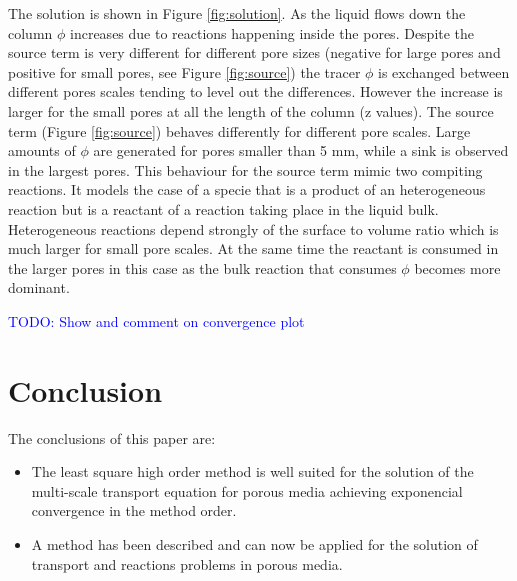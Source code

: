 \documentclass{CFD2011}
\newcommand{\TODO}[1]{\textcolor{blue}{TODO: #1} \\}
\begin{document}

The solution is shown in Figure \ref{fig:solution}. As the liquid flows down the column $\phi$ increases due to reactions happening inside the pores. Despite the source term is very different for different pore sizes (negative for large pores and positive for small pores, see Figure \ref{fig:source}) the tracer $\phi$ is exchanged between different pores scales tending to level out the differences. However the increase is larger for the small pores at all the length of the column (z values). The source term (Figure \ref{fig:source}) behaves differently for different pore scales. Large amounts of $\phi$ are generated for pores smaller than 5 mm, while a sink is observed in the largest pores. This behaviour for the source term mimic two compiting reactions. It models the case of a specie that is a product of an heterogeneous reaction but is a reactant of a reaction taking place in the liquid bulk. Heterogeneous reactions depend strongly of the surface to volume ratio which is much larger for small pore scales. At the same time the reactant is consumed in the larger pores in this case as the bulk reaction that consumes $\phi$ becomes more dominant.




\TODO{Show and comment on convergence plot}



\section{Conclusion}

The conclusions of this paper are:

\begin{itemize}
\item The least square high order method is well suited for the solution of the multi-scale transport equation for porous media achieving exponencial convergence in the method order.
\item A method has been described and can now be applied for the solution of transport and reactions problems in porous media.
\end{itemize}
\end{document}
